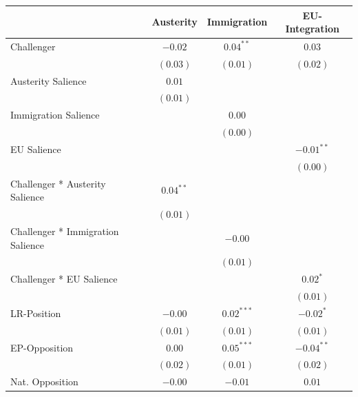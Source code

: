 
\usepackage{booktabs}

\begin{table}
\begin{center}
\begin{tabular}{l c c c}
\toprule
 & Austerity & Immigration & EU-Integration \\
\midrule
Challenger                        & $-0.02$      & $0.04^{**}$  & $0.03$       \\
                                  & $(0.03)$     & $(0.01)$     & $(0.02)$     \\
Austerity Salience                & $0.01$       &              &              \\
                                  & $(0.01)$     &              &              \\
Immigration Salience              &              & $0.00$       &              \\
                                  &              & $(0.00)$     &              \\
EU Salience                       &              &              & $-0.01^{**}$ \\
                                  &              &              & $(0.00)$     \\
Challenger * Austerity Salience   & $0.04^{**}$  &              &              \\
                                  & $(0.01)$     &              &              \\
Challenger * Immigration Salience &              & $-0.00$      &              \\
                                  &              & $(0.01)$     &              \\
Challenger * EU Salience          &              &              & $0.02^{*}$   \\
                                  &              &              & $(0.01)$     \\
LR-Position                       & $-0.00$      & $0.02^{***}$ & $-0.02^{*}$  \\
                                  & $(0.01)$     & $(0.01)$     & $(0.01)$     \\
EP-Opposition                     & $0.00$       & $0.05^{***}$ & $-0.04^{**}$ \\
                                  & $(0.02)$     & $(0.01)$     & $(0.02)$     \\
Nat. Opposition                   & $-0.00$      & $-0.01$      & $0.01$       \\

\end{tabular}
\end{center}
\end{table}
